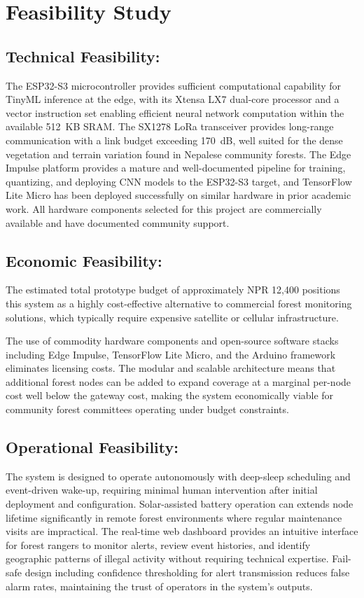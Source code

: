 \section{Feasibility Study}
\subsection{Technical Feasibility:}The ESP32-S3 microcontroller provides sufficient computational capability for TinyML inference at the edge, with its Xtensa LX7
dual-core processor and a vector instruction set enabling efficient neural network
computation within the available 512~KB SRAM. The SX1278 LoRa transceiver provides
long-range communication with a link budget exceeding 170~dB, well suited for the
dense vegetation and terrain variation found in Nepalese community forests. The
Edge Impulse platform provides a mature and well-documented pipeline for training,
quantizing, and deploying CNN models to the ESP32-S3 target, and TensorFlow Lite
Micro has been deployed successfully on similar hardware in prior academic work.
All hardware components selected for this project are commercially available and
have documented community support.

\subsection{Economic Feasibility:} The estimated total prototype budget of
approximately NPR 12,400 positions this system as a highly cost-effective
alternative to commercial forest monitoring solutions, which typically require
expensive satellite or cellular infrastructure.

The use of commodity hardware components and open-source software stacks
including Edge Impulse, TensorFlow Lite Micro, and the Arduino framework
eliminates licensing costs. The modular and scalable architecture means that
additional forest nodes can be added to expand coverage at a marginal per-node
cost well below the gateway cost, making the system economically viable for
community forest committees operating under budget constraints.

\subsection{Operational Feasibility:} The system is designed to operate autonomously
with deep-sleep scheduling and event-driven wake-up, requiring minimal human
intervention after initial deployment and configuration. Solar-assisted battery
operation can extends node lifetime significantly in remote forest environments
where regular maintenance visits are impractical. The real-time web dashboard
provides an intuitive interface for forest rangers to monitor alerts, review event
histories, and identify geographic patterns of illegal activity without requiring
technical expertise. Fail-safe design including confidence thresholding for alert
transmission reduces false alarm rates, maintaining the trust of operators in the
system's outputs.

